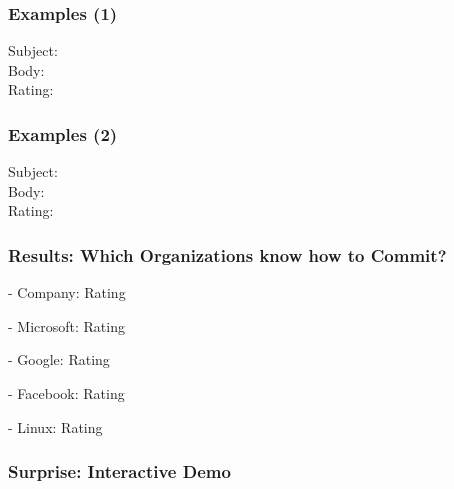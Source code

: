 \documentclass{beamer}
\begin{document}
\begin{frame}

\frametitle{Examples (1)}
	Subject: \\%
	Body: \\%
	Rating:

\end{frame}

\begin{frame}

\frametitle{Examples (2)}
	Subject: \\%
	Body: \\%
	Rating:

\end{frame}

\begin{frame}

\frametitle{Results: Which Organizations know how to Commit?}
	\begin{description}
		\item{-} Company: Rating
		\item{-} Microsoft: Rating
		\item{-} Google: Rating
		\item{-} Facebook: Rating
		\item{-} Linux: Rating
	\end{description}

\end{frame}

\begin{frame}

\frametitle{Surprise: Interactive Demo}

\end{frame}
\end{document}
